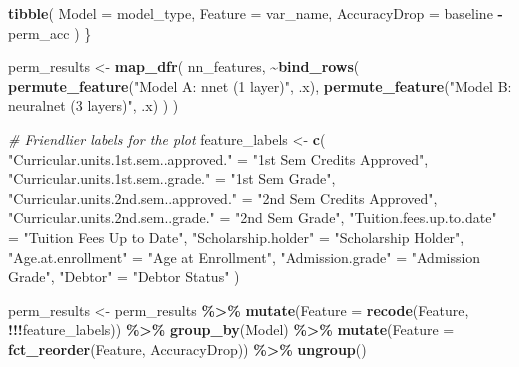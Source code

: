 \documentclass[
]{article}
\newenvironment{Shaded}{\begin{snugshade}}{\end{snugshade}}
\newcommand{\AttributeTok}[1]{\textcolor[rgb]{0.13,0.29,0.53}{#1}}
\newcommand{\CommentTok}[1]{\textcolor[rgb]{0.56,0.35,0.01}{\textit{#1}}}
\newcommand{\FunctionTok}[1]{\textcolor[rgb]{0.13,0.29,0.53}{\textbf{#1}}}
\newcommand{\NormalTok}[1]{#1}
\newcommand{\OtherTok}[1]{\textcolor[rgb]{0.56,0.35,0.01}{#1}}
\newcommand{\SpecialCharTok}[1]{\textcolor[rgb]{0.81,0.36,0.00}{\textbf{#1}}}
\newcommand{\StringTok}[1]{\textcolor[rgb]{0.31,0.60,0.02}{#1}}
\begin{document}
\begin{Shaded}
\begin{Highlighting}[]
  \FunctionTok{tibble}\NormalTok{(}
    \AttributeTok{Model =}\NormalTok{ model\_type,}
    \AttributeTok{Feature =}\NormalTok{ var\_name,}
    \AttributeTok{AccuracyDrop =}\NormalTok{ baseline }\SpecialCharTok{{-}}\NormalTok{ perm\_acc}
\NormalTok{  )}
\NormalTok{\}}

\NormalTok{perm\_results }\OtherTok{\textless{}{-}} \FunctionTok{map\_dfr}\NormalTok{(}
\NormalTok{  nn\_features,}
  \SpecialCharTok{\textasciitilde{}}\FunctionTok{bind\_rows}\NormalTok{(}
    \FunctionTok{permute\_feature}\NormalTok{(}\StringTok{"Model A: nnet (1 layer)"}\NormalTok{, .x),}
    \FunctionTok{permute\_feature}\NormalTok{(}\StringTok{"Model B: neuralnet (3 layers)"}\NormalTok{, .x)}
\NormalTok{  )}
\NormalTok{)}

\CommentTok{\# Friendlier labels for the plot}
\NormalTok{feature\_labels }\OtherTok{\textless{}{-}} \FunctionTok{c}\NormalTok{(}
  \StringTok{"Curricular.units.1st.sem..approved."} \OtherTok{=} \StringTok{"1st Sem Credits Approved"}\NormalTok{,}
  \StringTok{"Curricular.units.1st.sem..grade."} \OtherTok{=} \StringTok{"1st Sem Grade"}\NormalTok{,}
  \StringTok{"Curricular.units.2nd.sem..approved."} \OtherTok{=} \StringTok{"2nd Sem Credits Approved"}\NormalTok{,}
  \StringTok{"Curricular.units.2nd.sem..grade."} \OtherTok{=} \StringTok{"2nd Sem Grade"}\NormalTok{,}
  \StringTok{"Tuition.fees.up.to.date"} \OtherTok{=} \StringTok{"Tuition Fees Up to Date"}\NormalTok{,}
  \StringTok{"Scholarship.holder"} \OtherTok{=} \StringTok{"Scholarship Holder"}\NormalTok{,}
  \StringTok{"Age.at.enrollment"} \OtherTok{=} \StringTok{"Age at Enrollment"}\NormalTok{,}
  \StringTok{"Admission.grade"} \OtherTok{=} \StringTok{"Admission Grade"}\NormalTok{,}
  \StringTok{"Debtor"} \OtherTok{=} \StringTok{"Debtor Status"}
\NormalTok{)}

\NormalTok{perm\_results }\OtherTok{\textless{}{-}}\NormalTok{ perm\_results }\SpecialCharTok{\%\textgreater{}\%}
  \FunctionTok{mutate}\NormalTok{(}\AttributeTok{Feature =} \FunctionTok{recode}\NormalTok{(Feature, }\SpecialCharTok{!!!}\NormalTok{feature\_labels)) }\SpecialCharTok{\%\textgreater{}\%}
  \FunctionTok{group\_by}\NormalTok{(Model) }\SpecialCharTok{\%\textgreater{}\%}
  \FunctionTok{mutate}\NormalTok{(}\AttributeTok{Feature =} \FunctionTok{fct\_reorder}\NormalTok{(Feature, AccuracyDrop)) }\SpecialCharTok{\%\textgreater{}\%}
  \FunctionTok{ungroup}\NormalTok{()}


\end{Highlighting}
\end{Shaded}
\end{document}
